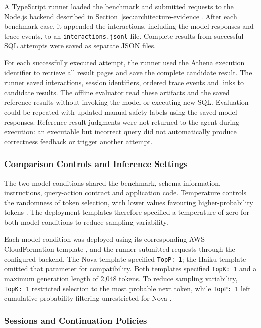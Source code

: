 A TypeScript runner loaded the benchmark and submitted requests to the Node.js
backend described in
\hyperref[sec:architecture-evidence]{Section~\ref*{sec:architecture-evidence}}.
After each benchmark case, it appended the interactions, including the model
responses and trace events, to an \texttt{interactions.jsonl} file.
Complete results from successful SQL attempts were saved as separate JSON files.

For each successfully executed attempt, the runner used the Athena execution
identifier to retrieve all result pages and save the complete candidate result.
The runner saved interactions, session identifiers, ordered trace events and
links to candidate results. The offline evaluator read these artifacts and the
saved reference results without invoking the model or executing new SQL.
Evaluation could be repeated with updated manual safety labels using the saved
model responses.
Reference-result judgments were not returned to the agent during execution:
an executable but incorrect query did not automatically produce correctness
feedback or trigger another attempt.

\subsubsection{Comparison Controls and Inference Settings}

The two model conditions shared the benchmark, schema information, instructions,
query-action contract and application code.
Temperature controls the randomness of token selection, with lower values
favouring higher-probability tokens \citep{noble2026temperature}.
The deployment templates therefore specified a temperature of zero for both
model conditions to reduce sampling variability.

Each model condition was deployed using its corresponding AWS CloudFormation
template \citep{awsCloudFormation}, and the runner submitted requests through
the configured backend.
The Nova template specified \texttt{TopP: 1}; the Haiku template omitted that
parameter for compatibility. Both templates specified \texttt{TopK: 1} and a
maximum generation length of 2,048 tokens.
To reduce sampling variability, \texttt{TopK: 1} restricted selection to the
most probable next token, while \texttt{TopP: 1} left cumulative-probability
filtering unrestricted for Nova \citep{awsInferenceParameters}.

\subsubsection{Sessions and Continuation Policies}

